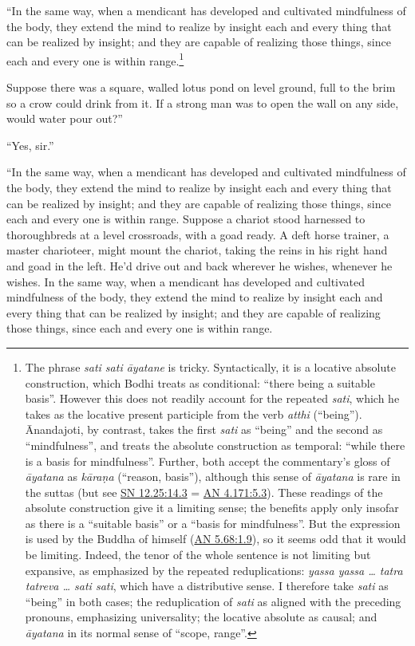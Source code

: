 \documentclass[12pt,openany]{book}%
\begin{document}
“In the same way, when a mendicant has developed and cultivated mindfulness of the body, they extend the mind to realize by insight each and every thing that can be realized by insight; and they are capable of realizing those things, since each and every one is within range.\footnote{The phrase \textit{sati sati \textsanskrit{āyatane}} is tricky. Syntactically, it is a locative absolute construction, which Bodhi treats as conditional: “there being a suitable basis”. However this does not readily account for the repeated \textit{sati}, which he takes as the locative present participle from the verb \textit{atthi} (“being”). Ānandajoti, by contrast, takes the first \textit{sati} as “being” and the second as “mindfulness”, and treats the absolute construction as temporal: “while there is a basis for mindfulness”. Further, both accept the commentary’s gloss of \textit{\textsanskrit{āyatana}} as \textit{\textsanskrit{kāraṇa}} (“reason, basis”), although this sense of \textit{\textsanskrit{āyatana}} is rare in the suttas (but see \href{https://suttacentral.net/sn12.25/en/sujato\#14.3}{SN 12.25:14.3} = \href{https://suttacentral.net/an4.171/en/sujato\#5.3}{AN 4.171:5.3}). These readings of the absolute construction give it a limiting sense; the benefits apply only insofar as there is a “suitable basis” or a “basis for mindfulness”. But the expression is used by the Buddha of himself (\href{https://suttacentral.net/an5.68/en/sujato\#1.9}{AN 5.68:1.9}), so it seems odd that it would be limiting. Indeed, the tenor of the whole sentence is not limiting but expansive, as emphasized by the repeated reduplications: \textit{yassa yassa … tatra tatreva … sati sati}, which have a distributive sense. I therefore take \textit{sati} as “being” in both cases; the reduplication of \textit{sati} as aligned with the preceding pronouns, emphasizing universality; the locative absolute as causal; and \textit{\textsanskrit{āyatana}}  in its normal sense of “scope, range”. } 

Suppose there was a square, walled lotus pond on level ground, full to the brim so a crow could drink from it. If a strong man was to open the wall on any side, would water pour out?” 

“Yes, sir.” 

“In the same way, when a mendicant has developed and cultivated mindfulness of the body, they extend the mind to realize by insight each and every thing that can be realized by insight; and they are capable of realizing those things, since each and every one is within range. Suppose a chariot stood harnessed to thoroughbreds at a level crossroads, with a goad ready. A deft horse trainer, a master charioteer, might mount the chariot, taking the reins in his right hand and goad in the left. He’d drive out and back wherever he wishes, whenever he wishes. In the same way, when a mendicant has developed and cultivated mindfulness of the body, they extend the mind to realize by insight each and every thing that can be realized by insight; and they are capable of realizing those things, since each and every one is within range. 
\end{document}
